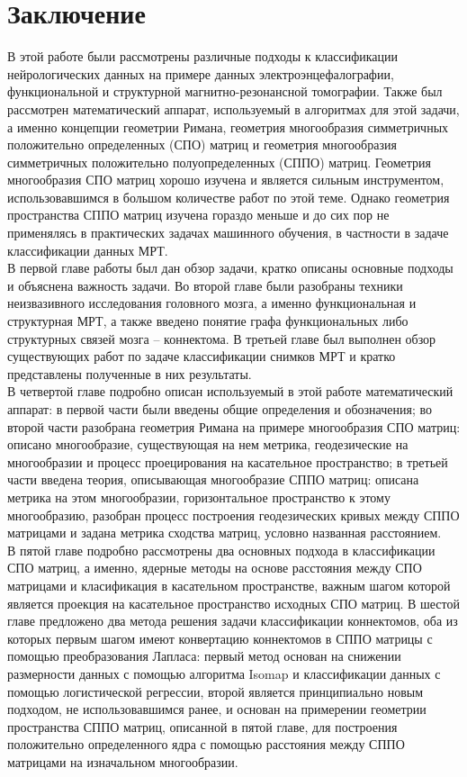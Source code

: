 \chapter{Заключение}
\indent В этой работе были рассмотрены различные подходы к классификации нейрологических данных на примере данных электроэнцефалографии, функциональной и структурной магнитно-резонансной томографии. Также был рассмотрен математический аппарат, используемый в алгоритмах для этой задачи, а именно концепции геометрии Римана, геометрия многообразия симметричных положительно определенных (СПО) матриц и геометрия многообразия симметричных положительно полуопределенных (СППО) матриц. Геометрия многообразия СПО матриц хорошо изучена и является сильным инструментом, использовавшимся в большом количестве работ по этой теме. Однако геометрия пространства СППО матриц изучена гораздо меньше и до сих пор не применялясь в практических задачах машинного обучения, в частности в задаче классификации данных МРТ.\\
\indent В первой главе работы был дан обзор задачи, кратко описаны основные подходы и объяснена важность задачи. Во второй главе были разобраны техники неизвазивного исследования головного мозга, а именно функциональная и структурная МРТ, а также введено понятие графа функциональных либо структурных связей мозга – коннектома. В третьей главе был выполнен обзор существующих работ по задаче классификации снимков МРТ и кратко представлены полученные в них результаты. \\
\indent В четвертой главе подробно описан используемый в этой работе математический аппарат: в первой части были введены общие определения и обозначения; во второй части разобрана геометрия Римана на примере многообразия СПО матриц: описано многообразие, существующая на нем метрика, геодезические на многообразии и процесс проецирования на касательное пространство; в третьей части введена теория, описывающая многообразие СППО матриц: описана метрика на этом многообразии, горизонтальное пространство к этому многообразию, разобран процесс построения геодезических кривых между СППО матрицами и задана метрика сходства матриц, условно названная расстоянием. \\
\indent В пятой главе подробно рассмотрены два основных подхода в классификации СПО матриц, а именно, ядерные методы на основе расстояния между СПО матрицами и класификация в касательном пространстве, важным шагом которой является проекция на касательное пространство исходных СПО матриц. В шестой главе предложено два метода решения задачи классификации коннектомов, оба из которых первым шагом имеют конвертацию коннектомов в СППО матрицы с помощью преобразования Лапласа: первый метод основан на снижении размерности данных с помощью алгоритма Isomap и классификации данных с помощью логистической регрессии, второй является принципиально новым подходом, не использовавшимся ранее, и основан на примерении геометрии пространства СППО матриц, описанной в пятой главе, для построения положительно определенного ядра с помощью расстояния между СППО матрицами на изначальном многообразии. \\
